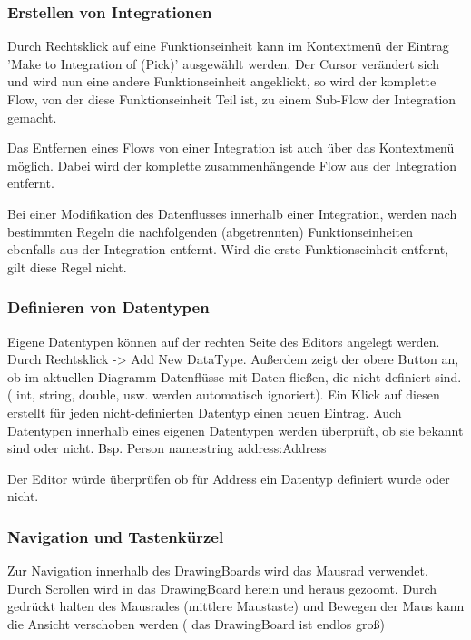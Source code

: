 \subsubsection{Erstellen von Integrationen}

	Durch Rechtsklick auf eine Funktionseinheit kann im Kontextmenü der Eintrag
	'Make to Integration of (Pick)' ausgewählt werden. Der Cursor verändert
	sich und wird nun eine andere Funktionseinheit angeklickt, so wird der
	komplette Flow, von der diese Funktionseinheit Teil ist, zu einem
	Sub-Flow der Integration gemacht.
	
	Das Entfernen eines Flows von einer Integration ist auch über das Kontextmenü
  möglich.
  Dabei wird der komplette zusammenhängende Flow aus der
	Integration entfernt. 
	
	
	Bei einer Modifikation des Datenflusses innerhalb einer Integration, werden nach
	bestimmten Regeln die nachfolgenden (abgetrennten) Funktionseinheiten
	ebenfalls aus der Integration entfernt. Wird die erste Funktionseinheit
	entfernt, gilt diese Regel nicht.
	
	\subsubsection{Definieren von Datentypen}

	Eigene Datentypen können auf der rechten Seite des Editors angelegt werden.
	Durch Rechtsklick -> Add New DataType. Außerdem zeigt der obere Button an,
	ob im aktuellen Diagramm Datenflüsse mit Daten fließen, die nicht definiert
	sind. ( int, string, double, usw. werden automatisch ignoriert). Ein Klick
	auf diesen erstellt für jeden nicht-definierten Datentyp einen neuen Eintrag.
	Auch Datentypen innerhalb eines eigenen Datentypen werden überprüft, ob sie 
	bekannt sind oder nicht. Bsp. 
	Person 
	name:string
	address:Address  
	
	Der Editor würde überprüfen ob für Address ein Datentyp definiert wurde oder nicht.
	
\subsubsection{Navigation und Tastenkürzel}

	Zur Navigation innerhalb des DrawingBoards wird das Mausrad verwendet.
	Durch Scrollen wird in das DrawingBoard herein und heraus gezoomt.
	Durch gedrückt halten des Mausrades (mittlere Maustaste) und Bewegen der
	Maus kann die Ansicht verschoben werden ( das DrawingBoard ist endlos groß)
	
